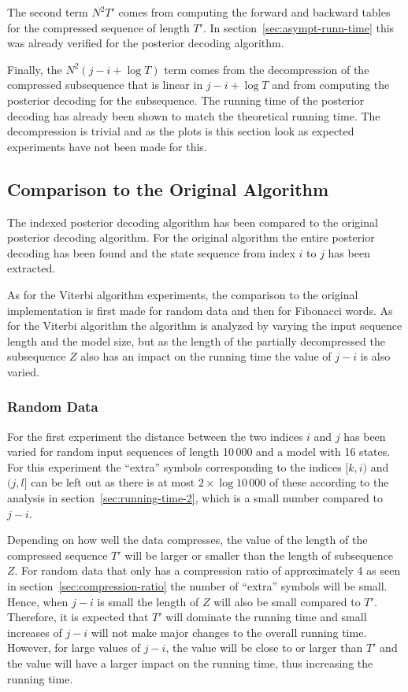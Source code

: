 The second term $N^2 T'$ comes from computing the forward and backward tables
for the compressed sequence of length $T'$. In
section~\ref{sec:asympt-runn-time} this was already verified for the posterior
decoding algorithm.

Finally, the $N^2 (j - i + \log T)$ term comes from the decompression of the
compressed subsequence that is linear in $j - i + \log T$ and from computing
the posterior decoding for the subsequence. The running time of the posterior
decoding has already been shown to match the theoretical running time. The
decompression is trivial and as the plots is this section look as expected
experiments have not been made for this.

\subsection{Comparison to the Original Algorithm}

The indexed posterior decoding algorithm has been compared to the original
posterior decoding algorithm. For the original algorithm the entire posterior
decoding has been found and the state sequence from index $i$ to $j$ has
been extracted.

As for the Viterbi algorithm experiments, the comparison to the
original implementation is first made for random data and then for Fibonacci
words. As for the Viterbi algorithm the algorithm is analyzed by varying the
input sequence length and the model size, but as the length of the partially
decompressed the subsequence $Z$ also has an impact on the running time the
value of $j - i$ is also varied.

\subsubsection{Random Data}

For the first experiment the distance between the two indices $i$ and $j$ has
been varied for random input sequences of length 10\,000 and a model with 16
states. For this experiment the ``extra'' symbols corresponding to the indices
$[k, i)$ and $(j, l]$ can be left out as there is at most $2 \times \log 10\,000$
of these according to the analysis in section~\ref{sec:running-time-2}, which
is a small number compared to $j - i$.

Depending on how well the data compresses, the value of the length of the
compressed sequence $T'$ will be larger or smaller than the length of
subsequence $Z$. For random data that only has a compression ratio of
approximately 4 as seen in section~\ref{sec:compression-ratio} the number of
``extra'' symbols will be small. Hence, when $j - i$ is small the length of $Z$
will also be small compared to $T'$. Therefore, it is expected that $T'$ will
dominate the running time and small increases of $j - i$ will not make major
changes to the overall running time. However, for large values of $j - i$, the
value will be close to or larger than $T'$ and the value will have a larger
impact on the running time, thus increasing the running time.

